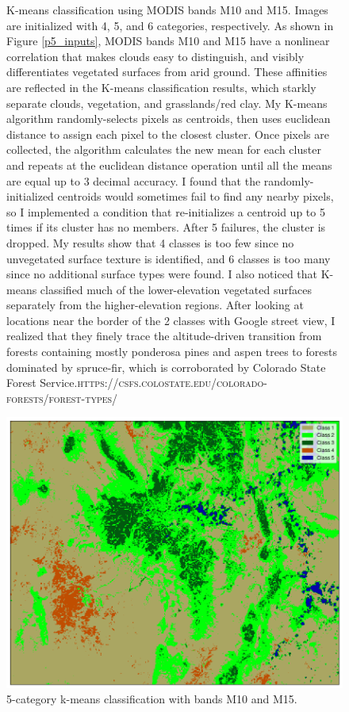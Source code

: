 \documentclass[12pt]{article}
\begin{document}
\begin{figure}[h!]
    \caption{K-means classification using MODIS bands M10 and M15. Images are initialized with 4, 5, and 6 categories, respectively. As shown in Figure \ref{p5_inputs}, MODIS bands M10 and M15 have a nonlinear correlation that makes clouds easy to distinguish, and visibly differentiates vegetated surfaces from arid ground. These affinities are reflected in the K-means classification results, which starkly separate clouds, vegetation, and grasslands/red clay. My K-means algorithm randomly-selects pixels as centroids, then uses euclidean distance to assign each pixel to the closest cluster. Once pixels are collected, the algorithm calculates the new mean for each cluster and repeats at the euclidean distance operation until all the means are equal up to 3 decimal accuracy. I found that the randomly-initialized centroids would sometimes fail to find any nearby pixels, so I implemented a condition that re-initializes a centroid up to 5 times if its cluster has no members. After 5 failures, the cluster is dropped. My results show that 4 classes is too few since no unvegetated surface texture is identified, and 6 classes is too many since no additional surface types were found. I also noticed that K-means classified much of the lower-elevation vegetated surfaces separately from the higher-elevation regions. After looking at locations near the border of the 2 classes with Google street view, I realized that they finely trace the altitude-driven transition from forests containing mostly ponderosa pines and aspen trees to forests dominated by spruce-fir, which is corroborated by Colorado State Forest Service.\newline \textsc{https://csfs.colostate.edu/colorado-forests/forest-types/}}
    \label{p6_456_classes}
\end{figure}

\begin{figure}[h!]
    \centering
    \includegraphics[width=.98\linewidth]{figures/p6/k-means_M10+M15_5cat_noborder.png}
    \caption{5-category k-means classification with bands M10 and M15. }
    \label{p6_noborder}
\end{figure}
\end{document}
